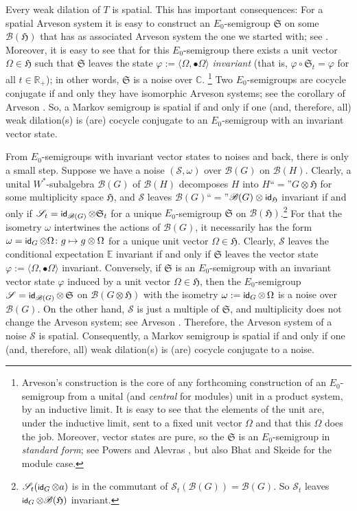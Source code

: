 \documentclass[pdftex]{sigma}%
\newcommand{\msf}[1]{\text{\small $\sf{#1}$}}
\newcommand{\eus}[1]{\mathscr{#1}}
\newcommand{\euf}[1]{\mathfrak{#1}}
\newcommand{\bb}[1]{\mathbb{#1}}
\newcommand{\vp}{\varphi}
\newcommand{\om}{\omega}
\newcommand{\Om}{\Omega}
\newcommand{\AB}[1]{\langle#1\rangle}
\DeclareMathOperator{\id}{\normalfont\msf{id}}
\DeclareMathOperator{\ssid}{\text{\footnotesize\sf{id}}}
\newcommand{\C}{\bb{C}}
\newcommand{\E}{\bb{E}}
\newcommand{\R}{\bb{R}}
\newcommand{\sB}{\eus{B}}
\newcommand{\sS}{\eus{S}}
\newcommand{\eH}{\euf{H}}
\newcommand{\eS}{\euf{S}}
\numberwithin{equation}{section}
\begin{document}
Every weak dilation of $T$ is spatial. This has important consequences: For a spatial Arveson system it is easy to construct an $E_0$-semigroup $\eS$ on some $\sB(\eH)$ that has as associated Arveson system the one we started with; see \cite[Appendix]{Arv89}. Moreover, it is easy to see that for this $E_0$-semigroup there exists a unit vector $\Om\in\eH$ such that $\eS$ leaves the state $\vp:=\AB{\Om,\bullet\Om}$ \emph{invariant} (that is, $\vp\circ\eS_t=\vp$ for all $t\in\R_+$); in other words, $\eS$ is a noise over $\C$.%
\footnote{Arveson's construction is the core of any forthcoming construction of an $E_0$-semigroup from a unital (and {\it central} for modules) unit in a product system, by an inductive limit. It is easy to see that the elements of the unit are, under the inductive limit, sent to a fixed unit vector $\Om$ and that this $\Om$ does the job. Moreover, vector states are pure, so the $\eS$ is an $E_0$-semigroup in {\it standard form}; see Powers \cite{Pow99} and Alevras \cite{Ale01}, but also Bhat and Skeide \cite{BhSk00,Ske02,Ske06d} for the module case.}
Two $E_0$-semigroups are cocycle conjugate if and only they have isomorphic Arveson systems; see the corollary of Arveson \cite[Definition 3.20]{Arv89}. So, a Markov semigroup is spatial if and only if one (and, therefore, all) weak dilation(s) is (are) cocycle conjugate to an $E_0$-semigroup with an invariant vector state.

From $E_0$-semigroups with invariant vector states to noises and back, there is only a small step. Suppose we have a noise $(\sS,\om)$ over $\sB(G)$ on $\sB(H)$. Clearly, a unital $W^*$-subalgebra $\sB(G)$ of $\sB(H)$ decomposes $H$ into $H$``$=$''$G\otimes\eH$ for some multiplicity space $\eH$, and $\sS$ leaves $\sB(G)$``$=$''$\sB(G)\otimes\id_\eH$ invariant if and only if $\sS_t=\id_{\sB(G)}\otimes\eS_t$ for a unique $E_0$-semigroup $\eS$ on $\sB(\eH)$.\footnote{$\sS_t(\ssid_G\otimes a)$ is in the commutant of $\sS_t(\sB(G))=\sB(G)$. So $\sS_t$ leaves $\ssid_G\otimes\sB(\eH)$ invariant.}
For that the isometry $\om$ intertwines the actions of $\sB(G)$, it necessarily has the form $\om=\id_G\otimes\Om\colon g\mapsto g\otimes\Om$ for a unique unit vector $\Om\in\eH$. Clearly, $\sS$ leaves the conditional expectation $\E$ invariant if and only if $\eS$ leaves the vector state $\vp:=\AB{\Om,\bullet\Om}$ invariant. Conversely, if $\eS$ is an $E_0$-semigroup with an invariant vector state $\vp$ induced by a unit vector $\Om\in\eH$, then the $E_0$-semigroup $\sS=\id_{\sB(G)}\otimes\,\eS$ on $\sB(G\otimes\eH)$ with the isometry $\om:=\id_G\otimes \,\Om$ is a noise over~$\sB(G)$. On the other hand, $\sS$ is just a multiple of $\eS$, and multiplicity does not change the Arveson system; see Arveson \cite[Poposition~3.15]{Arv89}. Therefore, the Arveson system of a noise $\sS$ is spatial. Consequently, a Markov semigroup is spatial if and only if one (and, therefore, all) weak dilation(s) is (are) cocycle conjugate to a noise.
\end{document}
